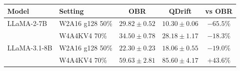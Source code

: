 \begin{tabular}{llccc}
\toprule
Model & Setting & OBR & QDrift & vs OBR \\
\midrule
LLaMA-2-7B & W2A16 g128 50\% & $29.82\pm0.52$ & $\mathbf{10.30\pm0.06}$ & $-65.5\%$ \\
 & W4A4KV4 70\% & $34.50\pm0.78$ & $\mathbf{28.18\pm1.17}$ & $-18.3\%$ \\
LLaMA-3.1-8B & W2A16 g128 50\% & $22.30\pm0.23$ & $\mathbf{18.06\pm0.55}$ & $-19.0\%$ \\
 & W4A4KV4 70\% & $59.63\pm2.81$ & $\mathbf{85.60\pm4.17}$ & $+43.6\%$ \\
\bottomrule
\end{tabular}
